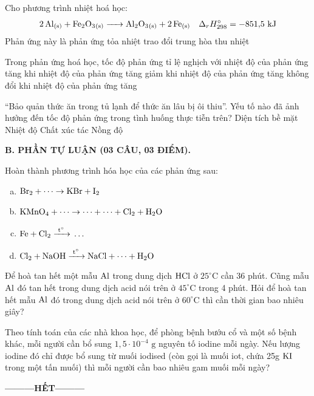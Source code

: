 \documentclass[12pt,a4paper]{article}
\begin{document}
\begin{ex}
Cho phương trình nhiệt hoá học:
\[\ce{2Al_{(s)} + Fe2O3_{(s)} -> Al2O3_{(s)} + 2Fe_{(s)}} \quad \Delta_r H^\circ_{298} = -851{,}5\text{ kJ}\]
Phản ứng này là phản ứng
\choice
{tỏa nhiệt}
{trao đổi}
{trung hòa}
{thu nhiệt}
\end{ex}

\begin{ex}
Trong phản ứng hoá học, tốc độ phản ứng
\choice
{tỉ lệ nghịch với nhiệt độ của phản ứng}
{tăng khi nhiệt độ của phản ứng tăng}
{giảm khi nhiệt độ của phản ứng tăng}
{không đổi khi nhiệt độ của phản ứng tăng}
\end{ex}

\begin{ex}
“Bảo quản thức ăn trong tủ lạnh để thức ăn lâu bị ôi thiu”. Yếu tố nào đã ảnh hưởng đến tốc độ phản ứng trong tình huống thực tiễn trên?
\choice
{Diện tích bề mặt}
{Nhiệt độ}
{Chất xúc tác}
{Nồng độ}
\end{ex}


\vspace{0.3cm}
\noindent
\textbf{B. PHẦN TỰ LUẬN (03 CÂU, 03 ĐIỂM).}

\begin{ex}
Hoàn thành phương trình hóa học của các phản ứng sau:
\begin{enumerate}[a.]
	\item $\ce{Br2} + \dots \rightarrow \ce{KBr} + \ce{I2}$
	\item $\ce{KMnO4} + \dots \rightarrow \dots + \dots + \ce{Cl2} + \ce{H2O}$
	\item $\ce{Fe + Cl2 ->[t^\circ]} \dots$
	\item $\ce{Cl2 + NaOH ->[t^\circ] NaCl} + \dots + \ce{H2O}$
\end{enumerate}
\loigiai{}
\end{ex}

\begin{ex}
Để hoà tan hết một mẫu $\ce{Al}$ trong dung dịch $\ce{HCl}$ ở $25^\circ\text{C}$ cần 36 phút. Cũng mẫu $\ce{Al}$ đó tan hết trong dung dịch acid nói trên ở $45^\circ\text{C}$ trong 4 phút. Hỏi để hoà tan hết mẫu $\ce{Al}$ đó trong dung dịch acid nói trên ở $60^\circ\text{C}$ thì cần thời gian bao nhiêu giây?
\loigiai{}
\end{ex}

\begin{ex}
Theo tính toán của các nhà khoa học, để phòng bệnh bướu cổ và một số bệnh khác, mỗi người cần bổ sung $1{,}5 \cdot 10^{-4}\text{ g}$ nguyên tố iodine mỗi ngày. Nếu lượng iodine đó chỉ được bổ sung từ muối iodised (còn gọi là muối iot, chứa 25g $\ce{KI}$ trong một tấn muối) thì mỗi người cần bao nhiêu gam muối mỗi ngày?
\loigiai{}
\end{ex}

\begin{center}
\textbf{---------HẾT---------}
\end{center}
\end{document}

